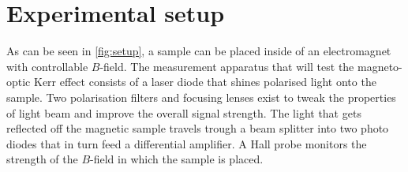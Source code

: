
\section{Experimental setup}
\label{sec:setup}



As can be seen in \autoref{fig:setup}, a sample can be placed inside of an
electromagnet with controllable $B$-field. The measurement apparatus that will test
the magneto-optic Kerr effect consists of a laser diode that shines polarised light 
onto the sample. Two polarisation filters and focusing lenses exist to tweak the 
properties of light beam and improve the overall signal strength. The light that gets
reflected off the magnetic sample travels trough a beam splitter into two photo 
diodes that in turn feed a differential amplifier. A Hall probe monitors the strength
of the $B$-field in which the sample is placed.
